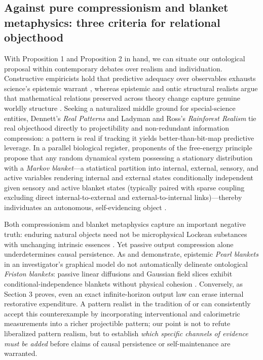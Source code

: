 \documentclass[11pt,a4paper]{article}
\begin{document}
\subsection{Against pure compressionism and blanket metaphysics: three
criteria for relational
objecthood}\label{against-pure-compressionism-and-blanket-metaphysics-three-criteria-for-relational-objecthood}

With Proposition 1 and Proposition 2 in hand, we can situate our
ontological proposal within contemporary debates over realism and
individuation. Constructive empiricists hold that predictive adequacy
over observables exhausts science's epistemic warrant
\citep{vanFraassen1980}, whereas epistemic and ontic structural realists
argue that mathematical relations preserved across theory change capture
genuine worldly structure \citep{worrall1989, ladyman1998}. Seeking a
naturalized middle ground for special-science entities, Dennett's
\citeyearpar{dennett1991} \emph{Real Patterns} and Ladyman and Ross's
\citeyearpar{ladymanRoss2007} \emph{Rainforest Realism} tie real
objecthood directly to projectibility and non-redundant information
compression: a pattern is real if tracking it yields better-than-bit-map
predictive leverage. In a parallel biological register, proponents of
the free-energy principle propose that any random dynamical system
possessing a stationary distribution with a \emph{Markov blanket}---a
statistical partition into internal, external, sensory, and active
variables rendering internal and external states conditionally
independent given sensory and active blanket states (typically paired
with sparse coupling excluding direct internal-to-external and
external-to-internal links)---thereby individuates an autonomous,
self-evidencing object \citep{friston2013, parrPezzuloFriston2022}.

Both compressionism and blanket metaphysics capture an important
negative truth: enduring natural objects need not be microphysical
Lockean substances with unchanging intrinsic essences
\citep{whitehead1929, dupre1993, dupreNicholson2018}. Yet passive output
compression alone underdetermines causal persistence. As
\citet{bruineberg2022} and \citet{raja2021} demonstrate, epistemic
\emph{Pearl blankets} in an investigator's graphical model do not
automatically delineate ontological \emph{Friston blankets}: passive
linear diffusions and Gaussian field slices exhibit
conditional-independence blankets without physical cohesion
\citep{biehl2021}. Conversely, as Section 3 proves, even an exact
infinite-horizon output law can erase internal restorative expenditure.
A pattern realist in the tradition of \citet{dennett1991} or
\citet{ladymanRoss2007} can consistently accept this counterexample by
incorporating interventional and calorimetric measurements into a richer
projectible pattern; our point is not to refute liberalized pattern
realism, but to establish \emph{which specific channels of evidence must
be added} before claims of causal persistence or self-maintenance are
warranted.
\end{document}
